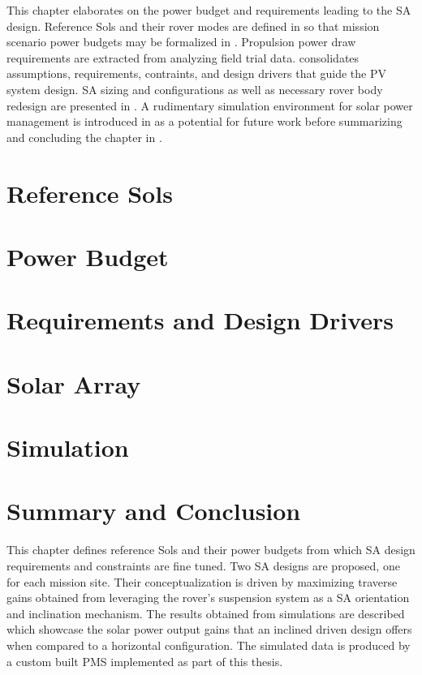 This chapter elaborates on the power budget and requirements leading to the \ac{SA} design. Reference Sols and their rover modes are defined in  so that mission scenario power budgets may be formalized in . Propulsion power draw requirements are extracted from analyzing field trial data.  consolidates assumptions, requirements, contraints, and design drivers that guide the \ac{PV} system design. \ac{SA} sizing and configurations as well as necessary rover body redesign are presented in . A rudimentary simulation environment for solar power management is introduced in  as a potential for future work before summarizing and concluding the chapter in .

\section{Reference Sols}
\label{sec:Design:ReferenceSols}


\clearpage
\section{Power Budget}
\label{sec:Design:PowerBudget}


\clearpage
\section{Requirements and Design Drivers}
\label{sec:Design:RequirementsAndDesignDrivers}


\clearpage
\section{Solar Array}
\label{sec:Design:SolarArray}


\clearpage
\section{Simulation}
\label{sec:Design:Simulation}


\section{Summary and Conclusion}
\label{sec:Design:SummaryAndConclusion}
This chapter defines reference Sols and their power budgets from which \ac{SA} design requirements and constraints are fine tuned. Two \ac{SA} designs are proposed, one for each mission site. Their conceptualization is driven by maximizing traverse gains obtained from leveraging the rover's suspension system as a \ac{SA} orientation and inclination mechanism. The results obtained from simulations are described which showcase the solar power output gains that an inclined driven design offers when compared to a horizontal configuration. The simulated data is produced by a custom built \ac{PMS} implemented as part of this thesis.
